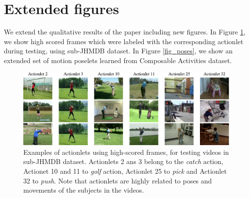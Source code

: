 \documentclass[10pt,letterpaper]{article}
\newcommand{\+}[1]{\ensuremath{{\boldsymbol #1}}}
\begin{document}
\section{Extended figures}

We extend the qualitative results of the paper including new figures. In Figure \ref{fig_actionlets}, we show high scored frames which were labeled with the corresponding actionlet during testing, using sub-JHMDB dataset. In Figure \ref{fig_poses}, we show an extended set of motion poselets learned from Composable Activities dataset. 

\begin{figure}[tb]
\begin{center}
\includegraphics[width=0.999\linewidth]{../Fig/fig_actionlets_subJHMDB.pdf}
\end{center}
\caption{Examples of actionlets using high-scored frames, for testing videos in sub-JHMDB dataset. Actionlets 2 ans 3 belong to the \textit{catch} action, Actionet 10 and 11 to \emph{golf} action, Actionlet 25 to \emph{pick} and Actionlet 32 to \emph{push}. Note that actionlets are highly related to poses and movements of the subjects in the videos.}
\label{fig_actionlets}
\end{figure}
\end{document}
